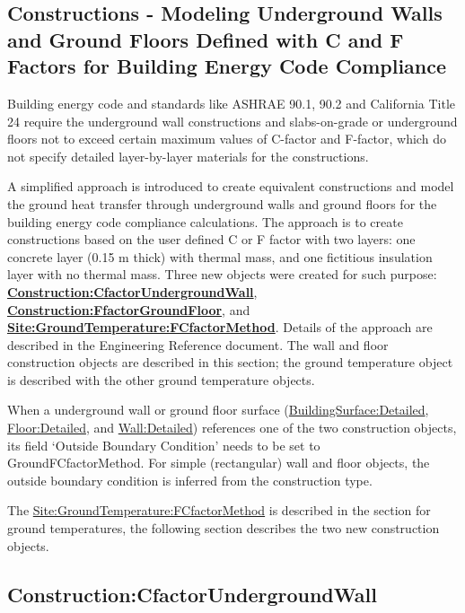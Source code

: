 \subsection{Constructions - Modeling Underground Walls and Ground Floors Defined with C and F Factors for Building Energy Code Compliance}\label{constructions---modeling-underground-walls-and-ground-floors-defined-with-c-and-f-factors-for-building-energy-code-compliance}

Building energy code and standards like ASHRAE 90.1, 90.2 and California Title 24 require the underground wall constructions and slabs-on-grade or underground floors not to exceed certain maximum values of C-factor and F-factor, which do not specify detailed layer-by-layer materials for the constructions.

A simplified approach is introduced to create equivalent constructions and model the ground heat transfer through underground walls and ground floors for the building energy code compliance calculations. The approach is to create constructions based on the user defined C or F factor with two layers: one concrete layer (0.15 m thick) with thermal mass, and one fictitious insulation layer with no thermal mass. Three new objects were created for such purpose: \textbf{\hyperref[constructioncfactorundergroundwall]{Construction:CfactorUndergroundWall}}, \textbf{\hyperref[constructionffactorgroundfloor]{Construction:FfactorGroundFloor}}, and \textbf{\hyperref[sitegroundtemperaturefcfactormethod]{Site:GroundTemperature:FCfactorMethod}}. Details of the approach are described in the Engineering Reference document. The wall and floor construction objects are described in this section; the ground temperature object is described with the other ground temperature objects.

When a underground wall or ground floor surface (\hyperref[buildingsurfacedetailed]{BuildingSurface:Detailed}, \hyperref[floordetailed]{Floor:Detailed}, and \hyperref[walldetailed]{Wall:Detailed}) references one of the two construction objects, its field `Outside Boundary Condition' needs to be set to GroundFCfactorMethod. For simple (rectangular) wall and floor objects, the outside boundary condition is inferred from the construction type.

The \hyperref[sitegroundtemperaturefcfactormethod]{Site:GroundTemperature:FCfactorMethod} is described in the section for ground temperatures, the following section describes the two new construction objects.

\subsection{Construction:CfactorUndergroundWall}\label{constructioncfactorundergroundwall}

